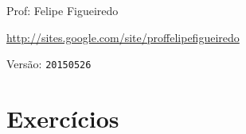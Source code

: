 \documentclass[a4paper]{article}
\begin{document}
\parbox[c]{.825\textwidth}{\raggedright%
{Prof: Felipe Figueiredo\par}
{\url{http://sites.google.com/site/proffelipefigueiredo}\par}
}

Versão: \verb|20150526|



\section{}

\section{Exercícios}
\end{document}

